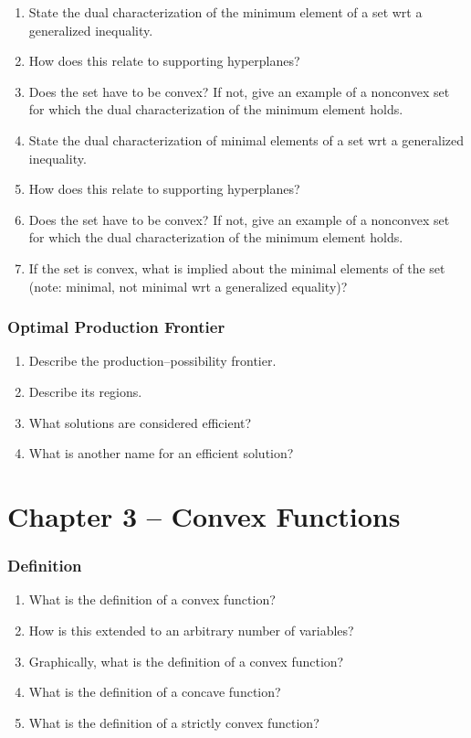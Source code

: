 \documentclass[]{article}
\newcounter{q}
\begin{document}
\begin{enumerate}[resume*]
\item State the dual characterization of the minimum element of a set wrt a generalized inequality.
\item How does this relate to supporting hyperplanes?
\item Does the set have to be convex? If not, give an example of a nonconvex set for which the dual characterization of the minimum element holds.
\item State the dual characterization of minimal elements of a set wrt a generalized inequality.
\item How does this relate to supporting hyperplanes?
\item Does the set have to be convex? If not, give an example of a nonconvex set for which the dual characterization of the minimum element holds.
\item If the set is convex, what is implied about the minimal elements of the set (note: minimal, not minimal wrt a generalized equality)?
\end{enumerate}

\subsubsection*{Optimal Production Frontier}

\begin{enumerate}[resume*]
\item Describe the production--possibility frontier.
\item Describe its regions.
\item What solutions are considered efficient?
\item What is another name for an efficient solution?\\
\end{enumerate}

\section*{Chapter 3 -- Convex Functions}

\subsubsection*{Definition}
\begin{enumerate}
\item What is the definition of a convex function?
\item How is this extended to an arbitrary number of variables?
\item Graphically, what is the definition of a convex function?
\item What is the definition of a concave function?
\item What is the definition of a strictly convex function?
\end{enumerate}
\end{document}
